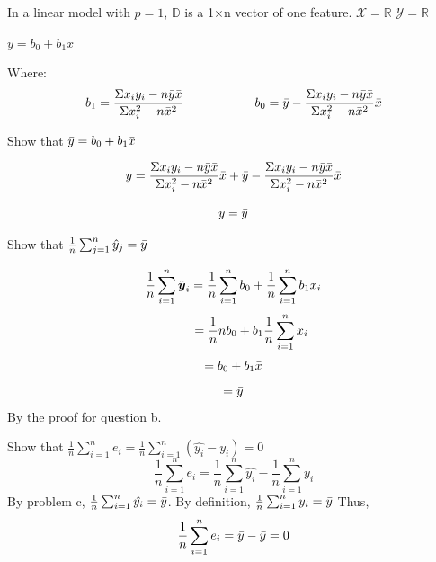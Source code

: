 \documentclass[12pt]{article}
\begin{document}
\begin{enumerate}


In a linear model with $p =1$, $\mathbb{D}$ is a 1$\times$n vector of one feature. \newline
$\mathcal{X} = \mathbb{R}$ \newline
$\mathcal{Y} = \mathbb{R}$



$y = b_0 + b_1 x$   \newline 

Where: $$b_1 = \frac{\Sigma x_i y_i -n \bar{y} \bar{x}}{\Sigma x_i^2 - n \bar{x}^2} \hspace{2 cm} b_0= \bar{y} - \frac{\Sigma x_i y_i -n \bar{y} \bar{x}}{\Sigma x_i^2 - n \bar{x}^2}\bar{x} $$

Show that $\bar{y} = b_0 + b_1 \bar{x}$

$$ y=  \frac{\Sigma x_i y_i -n \bar{y} \bar{x}}{\Sigma x_i^2 - n \bar{x}^2}\bar{x} + \bar{y} - \frac{\Sigma x_i y_i -n \bar{y} \bar{x}}{\Sigma x_i^2 - n \bar{x}^2}\bar{x} $$

$$y=   \bar{y} $$


Show that $\frac{1}{n}\sum_{j=1}^n\hat{y}_j =\bar{y}$

$$\frac{1}{n}\sum_{i=1}^n \hat{\boldsymbol{y}}_i = \frac{1}{n}\sum_{i=1}^n b_0 + \frac{1}{n}\sum_{i=1}^n b_1 x_i$$
$$\hspace{1 cm} = \frac{1}{n} nb_0 +b_1 \frac{1}{n}\sum_{i=1}^n x_i$$
$$= b_0 + b_1 \bar{x}$$
$$ = \bar{y}$$
By the proof for question b. 


Show that $\frac{1}{n}\sum_{i=1}^n e_i = \frac{1}{n}\sum_{i=1}^n (\hat{y_i} -y_i) =0 $ 
$$ \frac{1}{n}\sum_{i=1}^n e_i = \frac{1}{n}\sum_{i=1}^n \hat{y_i} - \frac{1}{n}\sum_{i=1}^n y_i$$
By problem c, $\frac{1}{n}\sum_{i=1}^n \hat{y_i} = \bar{y}$. By definition, $\frac{1}{n}\sum_{i=1}^n y_i = \bar{y}$ Thus, 
$$\frac{1}{n}\sum_{i=1}^n e_i = \bar{y} - \bar{y} = 0$$



\end{enumerate}
\end{document}
